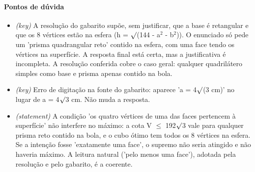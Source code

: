 \documentclass{article}%
\begin{document}
\paragraph{Pontos de dúvida}%
\begin{itemize}%
\item%
\textit{(key)} A resolução do gabarito supõe, sem justificar, que a base é retangular e que os 8 vértices estão na esfera (h = $\surd$(144 - a$^2$ - b$^2$)). O enunciado só pede um 'prisma quadrangular reto' contido na esfera, com uma face tendo os vértices na superfície. A resposta final está certa, mas a justificativa é incompleta. A resolução conferida cobre o caso geral: qualquer quadrilátero simples como base e prisma apenas contido na bola.%
\item%
\textit{(key)} Erro de digitação na fonte do gabarito: aparece 'a = 4$\surd$(3 cm)' no lugar de a = 4$\surd$3 cm. Não muda a resposta.%
\item%
\textit{(statement)} A condição 'os quatro vértices de uma das faces pertencem à superfície' não interfere no máximo: a cota V $\leq$ 192$\surd$3 vale para qualquer prisma reto contido na bola, e o cubo ótimo tem todos os 8 vértices na esfera. Se a intenção fosse 'exatamente uma face', o supremo não seria atingido e não haveria máximo. A leitura natural ('pelo menos uma face'), adotada pela resolução e pelo gabarito, é a coerente.%
\end{itemize}%
\end{document}

